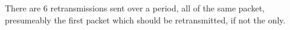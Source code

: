 There are 6 retransmissions sent over a period, all of the same packet, presumeably the first packet which should be retransmitted, if not the only.
